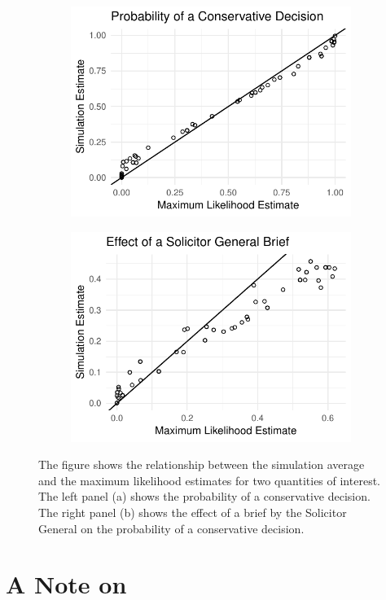 \documentclass[11pt]{article}
\begin{document}
\begin{figure}[h!]
\begin{subfigure}{.5\textwidth}
  \centering
  \includegraphics[width=.8\linewidth]{figs/ge-pr.pdf}
  \caption{}
  \label{fig:ge1}
\end{subfigure}%
\begin{subfigure}{.5\textwidth}
  \centering
  \includegraphics[width=.8\linewidth]{figs/ge-fd.pdf}
  \caption{}
  \label{fig:ge2}
\end{subfigure}
\caption{The figure shows the relationship between the simulation average and the maximum likelihood estimates for two quantities of interest. The left panel (a) shows the probability of a conservative decision. The right panel (b) shows the effect of a brief by the Solicitor General on the probability of a conservative decision.}
\label{fig:ge}
\end{figure}


\section*{A Note on \cite{HanmerKalkan2013}}
\end{document}
